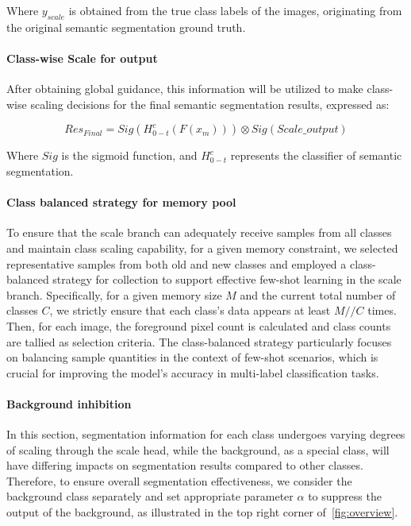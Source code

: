 Where \(y_{scale}\) is obtained from the true class labels of the images, originating from the original semantic segmentation ground truth.

\paragraph{Class-wise Scale for output}
After obtaining global guidance, this information will be utilized to make class-wise scaling decisions for the final semantic segmentation results, expressed as:

\[Res_{Final}=Sig(H_{0-t}^c(F(x_m)))\otimes Sig(Scale\_output)\]

Where \(Sig\) is the sigmoid function, and \(H_{0-t}^c\) represents the classifier of semantic segmentation.

\paragraph{Class balanced strategy for memory pool}
To ensure that the scale branch can adequately receive samples from all classes and maintain class scaling capability, for a given memory constraint, we selected representative samples from both old and new classes and employed a class-balanced strategy for collection to support effective few-shot learning in the scale branch. Specifically, for a given memory size \(M\) and the current total number of classes \(C\), we strictly ensure that each class's data appears at least \(M//C\) times. Then, for each image, the foreground pixel count is calculated and class counts are tallied as selection criteria. The class-balanced strategy particularly focuses on balancing sample quantities in the context of few-shot scenarios, which is crucial for improving the model's accuracy in multi-label classification tasks.


\paragraph{Background inhibition}
In this section, segmentation information for each class undergoes varying degrees of scaling through the scale head, while the background, as a special class, will have differing impacts on segmentation results compared to other classes. Therefore, to ensure overall segmentation effectiveness, we consider the background class separately and set appropriate parameter \( \alpha\) to suppress the output of the background, as illustrated in the top right corner of~\cref{fig:overview}.


